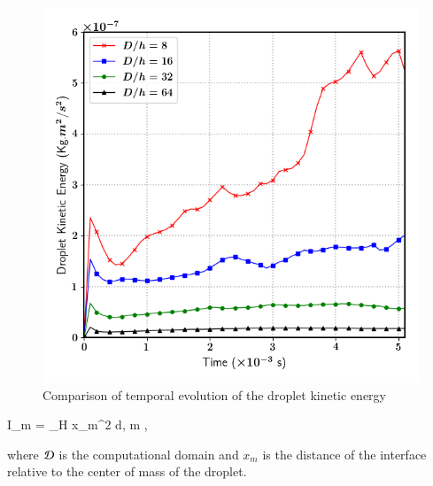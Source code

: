 \begin{figure}
\begin{center}
\includegraphics[scale = 0.5]{Figures/Sagar/drop_ke_ppd.png}
\end{center}
\vspace*{-0.5cm}
\caption{Comparison of temporal evolution of the droplet kinetic energy }
\label{drop_vel}
\end{figure}

\be
I_m = \int_\DDD H x_m^2 {\rm d}\X \;,  \le m ,
\nd

where ${\cal D}$ is the computational domain and $x_m$ is the distance of the interface relative to the center of mass of the droplet.   


